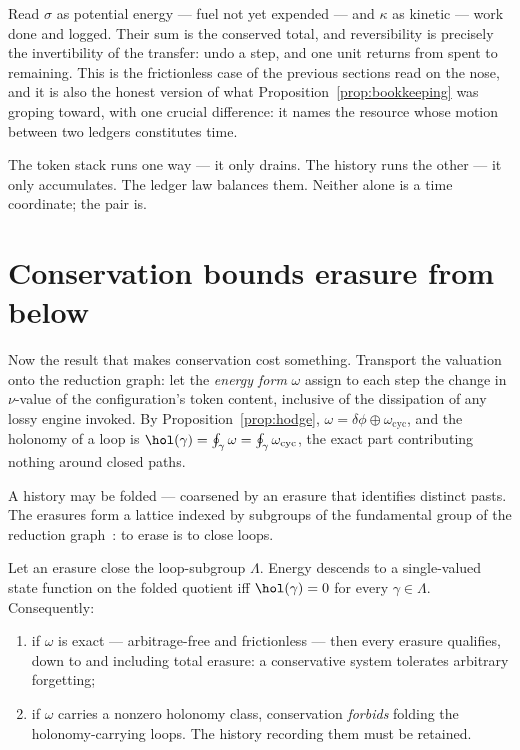 Read $\sigma$ as potential energy --- fuel not yet expended --- and
$\kappa$ as kinetic --- work done and logged.  Their sum is the conserved
total, and reversibility is precisely the invertibility of the transfer:
undo a step, and one unit returns from spent to remaining.  This is the
frictionless case of the previous sections read on the nose, and it is
also the honest version of what Proposition~\ref{prop:bookkeeping} was
groping toward, with one crucial difference: it names the resource whose
motion between two ledgers constitutes time.

\begin{remark}
The token stack runs one way --- it only drains.  The history runs the
other --- it only accumulates.  The ledger law balances them.  Neither
alone is a time coordinate; the pair is.
\end{remark}

\section{Conservation bounds erasure from below}
\label{sec:erasurebound}

Now the result that makes conservation cost something.  Transport the
valuation onto the reduction graph: let the \emph{energy form} $\omega$
assign to each step the change in $\nu$-value of the configuration's token
content, inclusive of the dissipation of any lossy engine invoked.  By
Proposition~\ref{prop:hodge}, $\omega = \delta\phi \oplus
\omega_{\mathrm{cyc}}$, and the holonomy of a loop is
$\hol(\gamma) = \oint_\gamma \omega = \oint_\gamma \omega_{\mathrm{cyc}}$,
the exact part contributing nothing around closed paths.

A history may be folded --- coarsened by an erasure that identifies
distinct pasts.  The erasures form a lattice indexed by subgroups of the
fundamental group of the reduction graph~\cite{History}: to erase is to
close loops.

\begin{theorem}
\label{thm:price}
Let an erasure close the loop-subgroup $\Lambda$.  Energy descends to a
single-valued state function on the folded quotient iff
$\hol(\gamma) = 0$ for every $\gamma \in \Lambda$.  Consequently:
\begin{enumerate}[label=\textup{(\roman*)}]
  \item if $\omega$ is exact --- arbitrage-free and frictionless --- then
        every erasure qualifies, down to and including total erasure: a
        conservative system tolerates arbitrary forgetting;
  \item if $\omega$ carries a nonzero holonomy class, conservation
        \emph{forbids} folding the holonomy-carrying loops.  The history
        recording them must be retained.
\end{enumerate}
\end{theorem}

